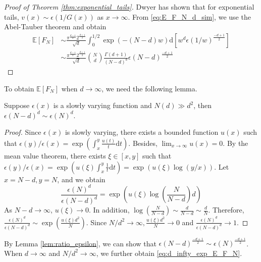 \documentclass{aptpub}
\def\E{\mathbb{E}}
\def\d{\mathrm{d}}
\begin{document}
\begin{proof}[Proof of Theorem \ref{thm:exponential_tails}]
Dwyer \cite{dwyer1991convex} has shown that for exponential tails, $v(x) \sim \epsilon(1/G(x))$ as $x\to \infty$.
From \eqref{eq:E_F_N_d_sim},
we use the Abel-Tauber theorem
\cite{omey1989abelian} and obtain
\begin{align*}
    \E[F_N] & \sim \frac{\pi^{\frac{d-1}{2}} 2^{\frac{d+1}{2}}}{\sqrt{d}}\int_0^{1/2} \exp(-(N-d)w) \d [w^d \epsilon(1/w)^{\frac{-d+1}{2}}] \\
    &\sim \frac{\pi^{\frac{d-1}{2}} 2^{\frac{d+1}{2}}}{\sqrt{d}} \binom{N}{d}\frac{\Gamma(d+1)}{(N-d)^d} \epsilon(N-d)^{\frac{-d+1}{2}}
\end{align*}
\end{proof}

To obtain $\E[F_N]$ when $d\to \infty$,
we need the following lemma.
\begin{lemma}\label{lem:ratio_epsilon}
     Suppose $\epsilon(x)$ is a slowly varying function
     and $N(d)\gg d^2$,
     then $\epsilon(N-d)^{d} \sim \epsilon(N)^d$.
\end{lemma}
\begin{proof}
     Since $\epsilon(x)$ is slowly varying, there exists
     a bounded function $u(x)$ such that
     $\epsilon(y)/\epsilon(x)=\exp(\int_{x}^y \frac{u(t)}{t}\d t)$.
     Besides, $\lim_{x\to \infty} u(x) = 0$.
     By the mean value theorem, there exists $\xi \in [x,y]$ such that
     $\epsilon(y)/\epsilon(x)=\exp(u(\xi)\int_{x}^y \frac{1}{t}\d t)
     =\exp(u(\xi)\log(y/x))$. Let $x=N-d, y=N$, and we obtain
     \begin{equation*}
          \frac{\epsilon(N)^d}{\epsilon(N-d)^d}
          = \exp \left(u(\xi) \log\left(\frac{N}{N-d} \right)d \right)
     \end{equation*}
     As $N-d\to \infty$, $u(\xi)\to 0$. In addition,
     $\log(\frac{N}{N-d}) \sim \frac{d}{N-d} \sim \frac{d}{N}$.
     Therefore,
     $\frac{\epsilon(N)^d}{\epsilon(N-d)^d}\sim \exp(\frac{u(\xi)d^2}{N})
     $. Since $N/d^2 \to \infty, \frac{u(\xi)d^2}{N} \to 0$ and
     $\frac{\epsilon(N)^d}{\epsilon(N-d)^d}\to 1$.
\end{proof}
By Lemma \ref{lem:ratio_epsilon}, we can show that
$\epsilon(N-d)^{\frac{-d+1}{2}}\sim \epsilon(N)^{\frac{-d+1}{2}}$.
When $d\to\infty$ and $N/d^2\to \infty$, we further obtain \eqref{eq:d_infty_exp_E_F_N}.
 
\end{document}
